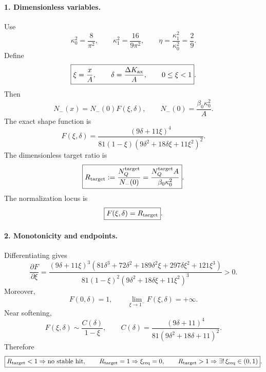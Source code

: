 \paragraph{1. Dimensionless variables.}
Use
\begin{equation}
\label{eq:app-stage035-DN-constants}
\boxed{
\kappa_0^2=\frac{8}{\pi^2},
\qquad
\kappa_1^2=\frac{16}{9\pi^2},
\qquad
\eta=\frac{\kappa_1^2}{\kappa_0^2}=\frac29}.
\end{equation}
Define
\begin{equation}
\label{eq:app-stage035-xi-delta}
\boxed{
\xi=\frac{x}{A},
\qquad
\delta=\frac{\Delta K_{\rm ax}}{A},
\qquad
0\leq\xi<1}.
\end{equation}
Then
\begin{equation}
\label{eq:app-stage035-factorization}
N_-(x)=N_-(0)F(\xi,\delta),
\qquad
N_-(0)=\frac{\beta_0\kappa_0^2}{A}.
\end{equation}
The exact shape function is
\begin{equation}
\label{eq:app-stage035-F}
\boxed{
F(\xi,\delta)=
\frac{(9\delta+11\xi)^4}{81(1-\xi)(9\delta^2+18\delta\xi+11\xi^2)^2}}.
\end{equation}
The dimensionless target ratio is
\begin{equation}
\label{eq:app-stage035-Rtarget}
\boxed{
R_{\rm target}:=\frac{N_Q^{\rm target}}{N_-(0)}
=\frac{N_Q^{\rm target}A}{\beta_0\kappa_0^2}}.
\end{equation}
The normalization locus is
\begin{equation}
\label{eq:app-stage035-F-locus}
\boxed{F(\xi,\delta)=R_{\rm target}}.
\end{equation}

\paragraph{2. Monotonicity and endpoints.}
Differentiating gives
\begin{equation}
\label{eq:app-stage035-F-derivative}
\boxed{
\frac{\partial F}{\partial\xi}
=
\frac{(9\delta+11\xi)^3
\left(81\delta^3+72\delta^2+189\delta^2\xi+297\delta\xi^2+121\xi^3\right)}
{81(1-\xi)^2(9\delta^2+18\delta\xi+11\xi^2)^3}>0}.
\end{equation}
Moreover,
\begin{equation}
\label{eq:app-stage035-F-endpoints}
F(0,\delta)=1,
\qquad
\lim_{\xi\to1^-}F(\xi,\delta)=+\infty.
\end{equation}
Near softening,
\begin{equation}
\label{eq:app-stage035-Cdelta}
F(\xi,\delta)\sim\frac{C(\delta)}{1-\xi},
\qquad
C(\delta)=\frac{(9\delta+11)^4}{81(9\delta^2+18\delta+11)^2}.
\end{equation}
Therefore
\begin{equation}
\label{eq:app-stage035-existence}
\boxed{
R_{\rm target}<1\Rightarrow\text{no stable hit},
\qquad
R_{\rm target}=1\Rightarrow\xi_{\rm req}=0,
\qquad
R_{\rm target}>1\Rightarrow\exists!\,\xi_{\rm req}\in(0,1)}.
\end{equation}

